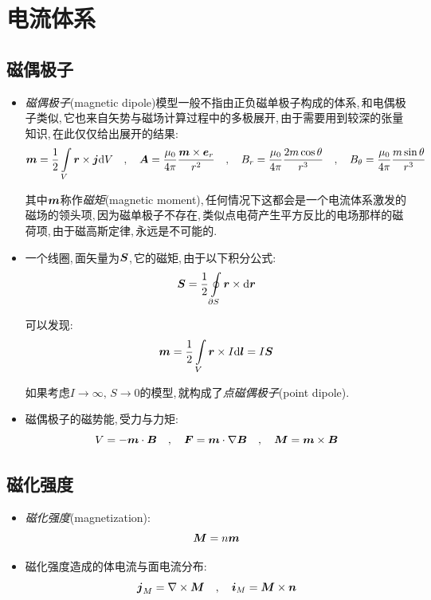 \section{电流体系}

\subsection{磁偶极子}

\begin{itemize}
\item \emph{磁偶极子}(magnetic dipole)模型一般不指由正负磁单极子构成的体系,\,和电偶极子类似,\,它也来自矢势与磁场计算过程中的多极展开,\,由于需要用到较深的张量知识,\,在此仅仅给出展开的结果:
\[\boldsymbol{m}=\frac{1}{2}\int\limits_V \boldsymbol{r}\times \boldsymbol{j}\textrm{d} V\quad ,\quad \boldsymbol{A}=\frac{\mu_0}{4\pi}\frac{\boldsymbol{m}\times \boldsymbol{e}_r}{r^2}\quad ,\quad B_r=\frac{\mu_0}{4\pi}\frac{2m\cos\theta }{r^3}\quad ,\quad B_\theta=\frac{\mu_0}{4\pi}\frac{m\sin\theta }{r^3}\]

其中$\boldsymbol{m}$称作\emph{磁矩}(magnetic moment),\,任何情况下这都会是一个电流体系激发的磁场的领头项,\,因为磁单极子不存在,\,类似点电荷产生平方反比的电场那样的磁荷项,\,由于磁高斯定律,\,永远是不可能的.

\item 一个线圈,\,面矢量为$\boldsymbol{S}$,\,它的磁矩,\,由于以下积分公式:
\[\boldsymbol{S}=\frac{1}{2}\oint\limits_{\partial S}\boldsymbol{r}\times \textrm{d} \boldsymbol{r}\]

可以发现:
\[\boldsymbol{m}=\frac{1}{2}\int\limits_V \boldsymbol{r}\times I \textrm{d} \boldsymbol{l}=I\boldsymbol{S}\]

如果考虑$I\to \infty,\,S\to 0$的模型,\,就构成了\emph{点磁偶极子}(point dipole).

\item 磁偶极子的磁势能,\,受力与力矩:
\[V=-\boldsymbol{m}\cdot \boldsymbol{B}\quad ,\quad \boldsymbol{F}=\boldsymbol{m}\cdot \nabla\boldsymbol{B}\quad ,\quad \boldsymbol{M}=\boldsymbol{m}\times \boldsymbol{B}\]

\end{itemize}

\subsection{磁化强度}

\begin{itemize}
\item \emph{磁化强度}(magnetization):
\[\boldsymbol{M}=n\boldsymbol{m}\]

\item 磁化强度造成的体电流与面电流分布:
\[\boldsymbol{j}_M=\nabla\times \boldsymbol{M}\quad ,\quad \boldsymbol{i}_M=\boldsymbol{M}\times \boldsymbol{n}\]


\end{itemize}

